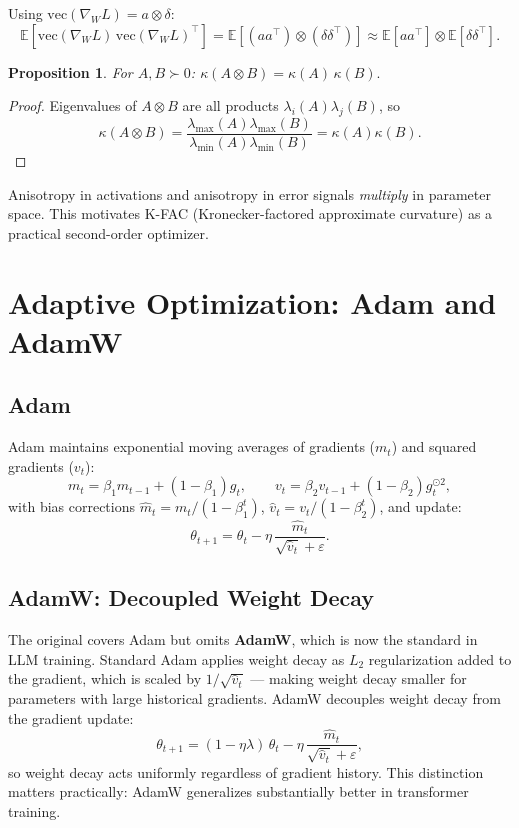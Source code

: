 \documentclass[12pt,a4paper]{article}
\newtheorem{proposition}{Proposition}[section]
\theoremstyle{definition}
\theoremstyle{remark}
\newcommand{\E}{\mathbb{E}}
\begin{document}
Using $\mathrm{vec}(\nabla_W L) = a \otimes \delta$:
\[
\E\!\left[\mathrm{vec}(\nabla_W L)\,\mathrm{vec}(\nabla_W L)^\top\right]
= \E\!\left[(aa^\top) \otimes (\delta\delta^\top)\right]
\approx \E[aa^\top] \otimes \E[\delta\delta^\top].
\]

\begin{proposition}
For $A,B \succ 0$: $\kappa(A \otimes B) = \kappa(A)\,\kappa(B).$
\end{proposition}
\begin{proof}
Eigenvalues of $A \otimes B$ are all products $\lambda_i(A)\lambda_j(B)$, so
\[
\kappa(A\otimes B) = \frac{\lambda_{\max}(A)\lambda_{\max}(B)}{\lambda_{\min}(A)\lambda_{\min}(B)} = \kappa(A)\kappa(B).
\]
\end{proof}

\begin{keybox}
Anisotropy in activations and anisotropy in error signals \emph{multiply} in parameter space. This motivates K-FAC (Kronecker-factored approximate curvature) as a practical second-order optimizer.
\end{keybox}

\section{Adaptive Optimization: Adam and AdamW}

\subsection{Adam}

Adam maintains exponential moving averages of gradients ($m_t$) and squared gradients ($v_t$):
\[
m_t = \beta_1 m_{t-1} + (1-\beta_1)g_t, \qquad
v_t = \beta_2 v_{t-1} + (1-\beta_2)g_t^{\odot 2},
\]
with bias corrections $\hat{m}_t = m_t/(1-\beta_1^t)$, $\hat{v}_t = v_t/(1-\beta_2^t)$, and update:
\[
\theta_{t+1} = \theta_t - \eta\,\frac{\hat{m}_t}{\sqrt{\hat{v}_t}+\varepsilon}.
\]

\subsection{AdamW: Decoupled Weight Decay}

\begin{critbox}
The original covers Adam but omits \textbf{AdamW}, which is now the standard in LLM training. Standard Adam applies weight decay as $L_2$ regularization added to the gradient, which is scaled by $1/\sqrt{\hat{v}_t}$ — making weight decay smaller for parameters with large historical gradients. AdamW decouples weight decay from the gradient update:
\[
\theta_{t+1} = (1 - \eta\lambda)\,\theta_t - \eta\,\frac{\hat{m}_t}{\sqrt{\hat{v}_t}+\varepsilon},
\]
so weight decay acts uniformly regardless of gradient history. This distinction matters practically: AdamW generalizes substantially better in transformer training.
\end{critbox}
\end{document}
